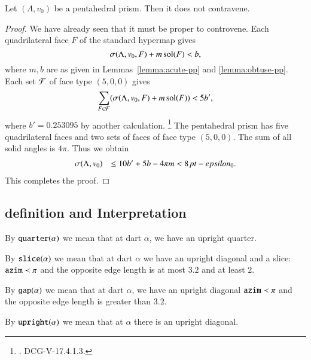 \begin{lemma}
Let $(\Lambda,v_0)$ be a pentahedral prism.  Then it does not
contravene.
\end{lemma}

\begin{proof} We have already seen that it must be proper to
controvene.  Each quadrilateral face $F$ of the standard hypermap
gives
   $$\sigma(\Lambda,v_0,F) + m\operatorname{sol}(F) < b,$$
where $m,b$ are as given in Lemmas~\ref{lemma:acute-pp} and 
\ref{lemma:obtuse-pp}.  Each set ${\mathcal F}$ of face type $(5,0,0)$ gives
   $$
   \sum_{F\in{\mathcal F}}(\sigma(\Lambda,v_0,F) + m\operatorname{sol}(F)) < 5 b',
   $$
where $b'= 0.253095$ by another calculation.%
\footnote{.  DCG-V-17.4.1.3.}
The pentahedral prism has five quadrilateral faces and two sets
of faces of face type $(5,0,0)$.  The sum of all solid angles is $4\pi$.
Thus we obtain
   $$
   \begin{array}{lll}
   \sigma(\Lambda,v_0) &\le 10 b' + 5 b - 4\pi m < 8\,\hbox{\it pt} -epsilon_0.
   \end{array}
   $$
This completes the proof.
\end{proof}


\subsection{definition and Interpretation}

\begin{definition}[quarter]
By ${\operatorname{{\texttt{quarter}}}}(\alpha)$ we mean that at dart $\alpha$, we have
an upright quarter.
\end{definition}

\begin{definition}[slice]
By ${\operatorname{{\texttt{slice}}}}(\alpha)$ we mean that at dart $\alpha$ we have an upright
diagonal and a slice: ${\operatorname{{\texttt{azim}}}}\prec \pi$ and
the opposite edge length is at most $3.2$ and at least $2$.
\end{definition}

\begin{definition}[gap]
By ${\operatorname{{\texttt{gap}}}}(\alpha)$ we mean that at dart $\alpha$, we have an
upright diagonal ${\operatorname{{\texttt{azim}}}}\prec \pi$ and the opposite edge length
is greater than $3.2$.
\end{definition}

\begin{definition}[upright]
By ${\operatorname{{\texttt{upright}}}}(\alpha)$ we mean that at $\alpha$ there is an upright
diagonal.
\end{definition}


